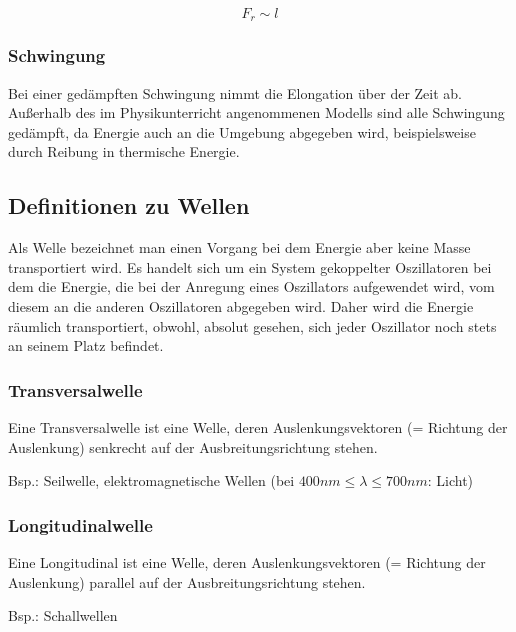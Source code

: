 \begin{equation} \label{eq:kriterium_harmonisch}
	F_{r} \sim l
\end{equation}


\subsubsection{Schwingung}

Bei einer gedämpften Schwingung nimmt die Elongation über der Zeit ab. Außerhalb des im Physikunterricht angenommenen Modells sind alle Schwingung gedämpft, da Energie auch an die Umgebung abgegeben wird, beispielsweise durch Reibung in thermische Energie.



\subsection{Definitionen zu Wellen}

Als Welle bezeichnet man einen Vorgang bei dem Energie aber keine Masse transportiert wird. Es handelt sich um ein System gekoppelter Oszillatoren bei dem die Energie, die bei der Anregung eines Oszillators aufgewendet wird, vom diesem an die anderen Oszillatoren abgegeben wird. Daher wird die Energie räumlich transportiert, obwohl, absolut gesehen, sich jeder Oszillator noch stets an seinem Platz befindet.

\subsubsection{Transversalwelle}

Eine Transversalwelle ist eine Welle, deren Auslenkungsvektoren (= Richtung der Auslenkung) senkrecht auf der Ausbreitungsrichtung stehen.

Bsp.: Seilwelle, elektromagnetische Wellen (bei $ 400nm \leq \lambda \leq 700nm $: Licht)

\subsubsection{Longitudinalwelle}

Eine Longitudinal ist eine Welle, deren Auslenkungsvektoren (= Richtung der Auslenkung) parallel auf der Ausbreitungsrichtung stehen.

Bsp.: Schallwellen














